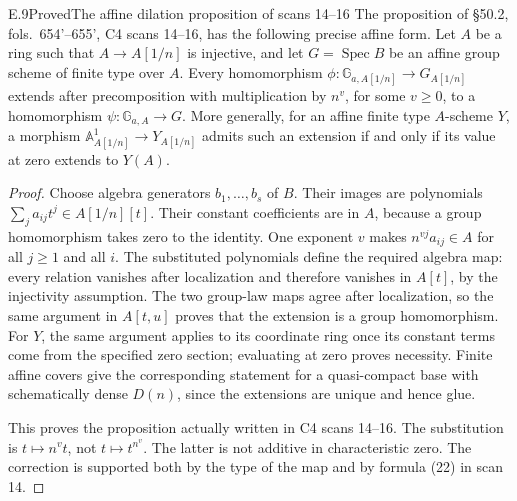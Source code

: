 \begin{statement}{E.9}{Proved}{The affine dilation proposition of scans 14--16}
The proposition of \S50.2, fols.~654'--655', C4 scans 14--16,
has the following precise affine form.
Let \(A\) be a ring such that \(A\to A[1/n]\) is injective, and let
\(G=\operatorname{Spec}B\) be an affine group scheme of finite type
over \(A\).  Every homomorphism
\(\phi:\mathbb G_{a,A[1/n]}\to G_{A[1/n]}\) extends after precomposition
with multiplication by \(n^v\), for some \(v\geq0\), to a
homomorphism \(\psi:\mathbb G_{a,A}\to G\).
More generally, for an affine finite type \(A\)-scheme \(Y\), a
morphism \(\mathbb A^1_{A[1/n]}\to Y_{A[1/n]}\) admits such an
extension if and only if its value at zero extends to \(Y(A)\).
\end{statement}
\begin{proof}
Choose algebra generators \(b_1,\ldots,b_s\) of \(B\).  Their images
are polynomials \(\sum_j a_{ij}t^j\in A[1/n][t]\).  Their constant
coefficients are in \(A\), because a group homomorphism takes zero
to the identity.  One exponent \(v\) makes
\(n^{vj}a_{ij}\in A\) for all \(j\geq1\) and all \(i\).  The
substituted polynomials define the required algebra map: every
relation vanishes after localization and therefore vanishes in
\(A[t]\), by the injectivity assumption.  The two group-law maps
agree after localization, so the same argument in \(A[t,u]\) proves
that the extension is a group homomorphism.  For \(Y\), the same
argument applies to its coordinate ring once its constant terms
come from the specified zero section; evaluating at zero proves
necessity.  Finite affine covers give the corresponding statement
for a quasi-compact base with schematically dense \(D(n)\), since
the extensions are unique and hence glue.

This proves the proposition actually written in C4 scans 14--16.
The substitution is \(t\mapsto n^vt\), not \(t\mapsto t^{n^v}\).
The latter is not additive in characteristic zero.  The correction
is supported both by the type of the map and by formula (22) in
scan 14.
\end{proof}

